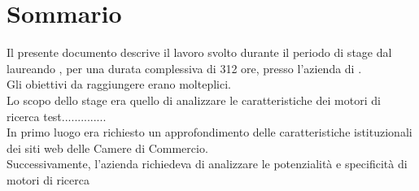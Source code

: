 
\cleardoublepage
{}
{}
\begingroup
\let\clearpage\relax
\let\cleardoublepage\relax
\let\cleardoublepage\relax

\chapter*{Sommario}

Il presente documento descrive il lavoro svolto durante il periodo di stage dal laureando \autore, per una durata complessiva di 312 ore, presso l'azienda \nomeAzienda di \locazioneAzienda. \\
Gli obiettivi da raggiungere erano molteplici. \\
Lo scopo dello stage era quello di analizzare le caratteristiche dei motori di ricerca \gls{test}..............\\
In primo luogo era richiesto un approfondimento delle caratteristiche istituzionali dei siti web delle Camere di Commercio. \\
Successivamente, l'azienda richiedeva di analizzare le potenzialità e specificità di motori di ricerca


\endgroup

\vfill